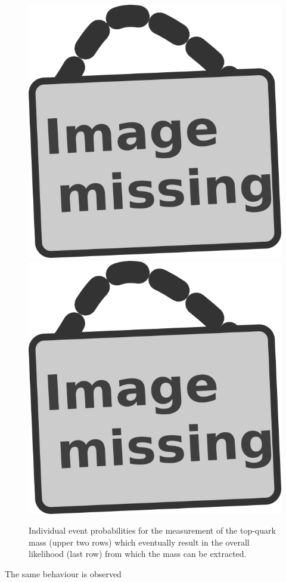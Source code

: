 \begin{figure}[h!tb]
 \includegraphics[width = 0.31 \textwidth]{image.png} \hspace{0.1cm} \\
 \includegraphics[width = 0.4 \textwidth]{image.png}
 \caption{Individual event probabilities for the measurement of the top-quark mass (upper two rows) which eventually result in the overall likelihood (last row) from which the mass can be extracted.} \label{fig::EvtProbsMTGen}
\end{figure}

The same behaviour is observed 

